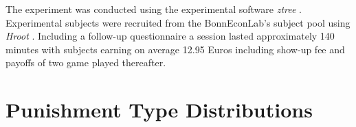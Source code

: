 \documentclass[11pt,a4paper]{article}
\begin{document}
\begin{refsection}
The experiment was conducted using the experimental software \emph{ztree}
\parencite{Fischbacher2007}. Experimental subjects were recruited from the
BonnEconLab's subject pool using \emph{Hroot} \parencite{Hroot}.
Including a follow-up questionnaire a session lasted 
approximately 140 minutes with subjects earning on average 12.95 Euros including
show-up fee and payoffs of two game played thereafter.


\section{Punishment Type Distributions}


\end{refsection}
\end{document}
